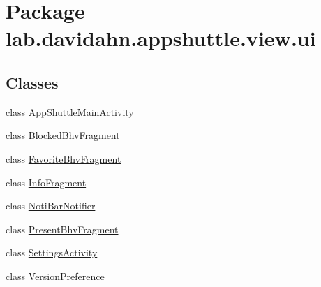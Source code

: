 \hypertarget{namespacelab_1_1davidahn_1_1appshuttle_1_1view_1_1ui}{\section{\-Package lab.\-davidahn.\-appshuttle.\-view.\-ui}
\label{namespacelab_1_1davidahn_1_1appshuttle_1_1view_1_1ui}
}
\subsection*{\-Classes}
\begin{DoxyCompactItemize}
\item 
class \hyperlink{classlab_1_1davidahn_1_1appshuttle_1_1view_1_1ui_1_1_app_shuttle_main_activity}{\-App\-Shuttle\-Main\-Activity}
\item 
class \hyperlink{classlab_1_1davidahn_1_1appshuttle_1_1view_1_1ui_1_1_blocked_bhv_fragment}{\-Blocked\-Bhv\-Fragment}
\item 
class \hyperlink{classlab_1_1davidahn_1_1appshuttle_1_1view_1_1ui_1_1_favorite_bhv_fragment}{\-Favorite\-Bhv\-Fragment}
\item 
class \hyperlink{classlab_1_1davidahn_1_1appshuttle_1_1view_1_1ui_1_1_info_fragment}{\-Info\-Fragment}
\item 
class \hyperlink{classlab_1_1davidahn_1_1appshuttle_1_1view_1_1ui_1_1_noti_bar_notifier}{\-Noti\-Bar\-Notifier}
\item 
class \hyperlink{classlab_1_1davidahn_1_1appshuttle_1_1view_1_1ui_1_1_present_bhv_fragment}{\-Present\-Bhv\-Fragment}
\item 
class \hyperlink{classlab_1_1davidahn_1_1appshuttle_1_1view_1_1ui_1_1_settings_activity}{\-Settings\-Activity}
\item 
class \hyperlink{classlab_1_1davidahn_1_1appshuttle_1_1view_1_1ui_1_1_version_preference}{\-Version\-Preference}
\end{DoxyCompactItemize}
